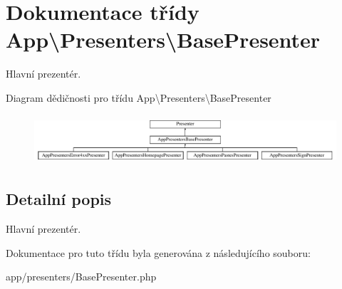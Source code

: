 \hypertarget{classApp_1_1Presenters_1_1BasePresenter}{\section{Dokumentace třídy App\textbackslash{}Presenters\textbackslash{}Base\-Presenter}
\label{classApp_1_1Presenters_1_1BasePresenter}
}


Hlavní prezentér.  


Diagram dědičnosti pro třídu App\textbackslash{}Presenters\textbackslash{}Base\-Presenter\begin{figure}[H]
\begin{center}
\leavevmode
\includegraphics[height=1.850220cm]{classApp_1_1Presenters_1_1BasePresenter}
\end{center}
\end{figure}


\subsection{Detailní popis}
Hlavní prezentér. 

Dokumentace pro tuto třídu byla generována z následujícího souboru\-:\begin{DoxyCompactItemize}
\item 
app/presenters/Base\-Presenter.\-php\end{DoxyCompactItemize}
